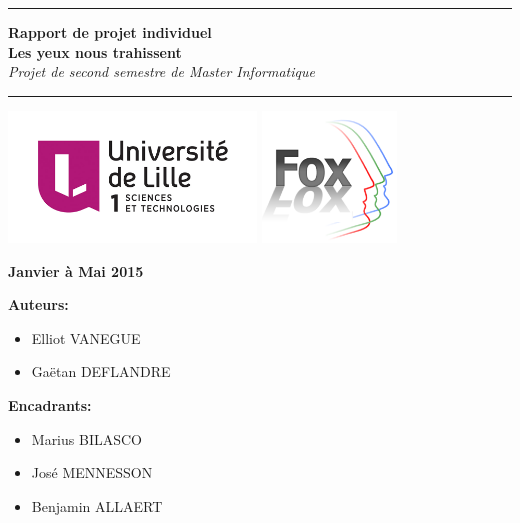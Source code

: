 \pagestyle{empty}



\begin{center}
  \hrule
  \vspace{1cm}
  \textbf{
  {\LARGE  
    Rapport de projet individuel\\
    \vspace{0.3cm}
    Les yeux nous trahissent
  }}\\
  \vspace{0.8cm}
  {\large\textit{\textcolor{mygray}{Projet de second semestre de Master Informatique}}}\\
  \vspace{0.8cm}
  \hrule

  \vspace{3cm}
  \includegraphics[height=3.5cm]{image/logoLILLE1.jpg}
  \hfill
  \includegraphics[height=3.5cm]{image/logoFOX.png}
  \vspace{4cm}

  \vspace{1cm}
  {\large\textbf{\textcolor{univmodif}{Janvier à Mai 2015}}}
  \vspace{2cm}
\end{center}

\begin{multicols}{2}  

    \textbf{\textcolor{univmodif}{Auteurs:}}\\
    \begin{itemize}
      \item Elliot VANEGUE
      \item Gaëtan DEFLANDRE
    \end{itemize}
    
    \textbf{\textcolor{univmodif}{Encadrants:}}
    \begin{itemize}
      \item Marius BILASCO
      \item José MENNESSON
      \item Benjamin ALLAERT
    \end{itemize}

\end{multicols}